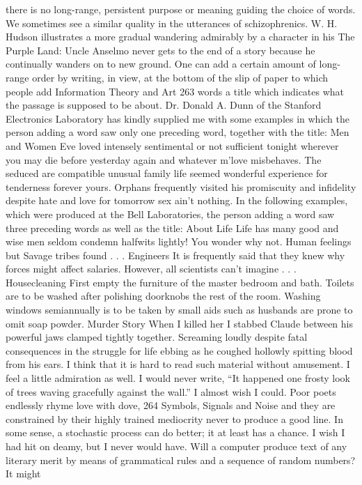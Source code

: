 {{{{{{{{{{{{there is no long-range, persistent purpose or meaning guiding the
choice of words. We sometimes see a similar quality in the utterances
of schizophrenics. W. H. Hudson illustrates a more gradual
wandering admirably by a character in his The Purple Land: Uncle
Anselmo never gets to the end of a story because he continually
wanders on to new ground.
One can add a certain amount of long-range order by writing,
in view, at the bottom of the slip of paper to which people add
Information Theory and Art 263
words a title which indicates what the passage is supposed to
be about.
Dr. Donald A. Dunn of the Stanford Electronics Laboratory has
kindly supplied me with some examples in which the person
adding a word saw only one preceding word, together with the title:
Men and Women
Eve loved intensely sentimental or not sufficient tonight wherever you
may die before yesterday again and whatever m’love misbehaves.
The seduced are compatible unusual family life seemed wonderful
experience for tenderness forever yours.
Orphans frequently visited his promiscuity and infidelity despite hate
and love for tomorrow sex ain’t nothing.
In the following examples, which were produced at the Bell
Laboratories, the person adding a word saw three preceding words
as well as the title:
About Life
Life has many good and wise men seldom condemn halfwits lightly! You
wonder why not. Human feelings but Savage tribes found . . .
Engineers
It is frequently said that they knew why forces might affect salaries.
However, all scientists can’t imagine . . .
Housecleaning
First empty the furniture of the master bedroom and bath. Toilets are
to be washed after polishing doorknobs the rest of the room. Washing
windows semiannually is to be taken by small aids such as husbands are
prone to omit soap powder.
Murder Story
When I killed her I stabbed Claude between his powerful jaws clamped
tightly together. Screaming loudly despite fatal consequences in the
struggle for life ebbing as he coughed hollowly spitting blood from his ears.
I think that it is hard to read such material without amusement.
I feel a little admiration as well. I would never write, “It happened
one frosty look of trees waving gracefully against the wall.” I
almost wish I could. Poor poets endlessly rhyme love with dove,
264
Symbols, Signals and Noise
and they are constrained by their highly trained mediocrity never
to produce a good line. In some sense, a stochastic process can do
better; it at least has a chance. I wish I had hit on deamy, but I
never would have.
Will a computer produce text of any literary merit by means of
grammatical rules and a sequence of random numbers? It might
}}}}}}}}}}}}
